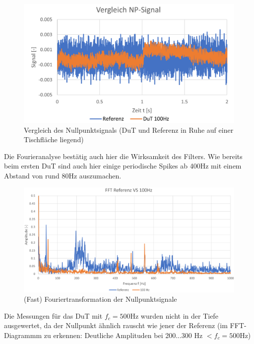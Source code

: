 \documentclass[12pt,a4paper]{article}
\begin{document}
	\begin{figure}[H]
		\centering
		\includegraphics[width=1\linewidth]{Np_comp_100Hz}
		\caption{Vergleich des Nullpunktsignals (DuT und Referenz in Ruhe auf einer Tischfläche liegend)}
		\label{fig:npcomp100hz}
	\end{figure}
\noindent Die Fourieranalyse bestätig auch hier die Wirksamkeit des Filters. Wie bereits beim ersten DuT sind auch hier einige periodische Spikes ab 400Hz mit einem Abstand von rund 80Hz auszumachen.
	\begin{figure}[H]
		\centering
		\includegraphics[width=1\linewidth]{FFT100Hz}
		\caption{(Fast) Fouriertransformation der Nullpunktsignale}
		\label{fig:fft100hz}
	\end{figure}	
\noindent Die Messungen für das DuT mit  $f_c=500$Hz wurden nicht in der Tiefe ausgewertet, da der Nullpunkt ähnlich rauscht wie jener der Referenz (im FFT-Diagrammm zu erkennen: Deutliche Amplituden bei 200...300 Hz  $< f_c =500$Hz)
	
\end{document}
